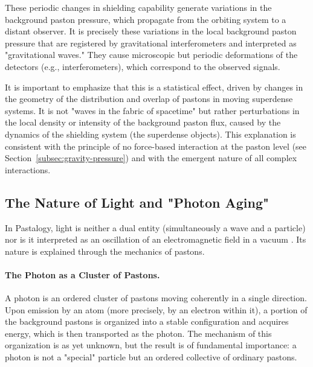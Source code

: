 \documentclass[pdflatex,sn-mathphys-num,referee]{sn-jnl}
\begin{document}
These periodic changes in shielding capability generate variations in the background paston pressure, which propagate from the orbiting system to a distant observer. It is precisely these variations in the local background paston pressure that are registered by gravitational interferometers and interpreted as "gravitational waves." They cause microscopic but periodic deformations of the detectors (e.g., interferometers), which correspond to the observed signals.

It is important to emphasize that this is a statistical effect, driven by changes in the geometry of the distribution and overlap of pastons in moving superdense systems. It is not "waves in the fabric of spacetime" but rather perturbations in the local density or intensity of the background paston flux, caused by the dynamics of the shielding system (the superdense objects). This explanation is consistent with the principle of no force-based interaction at the paston level (see Section~\ref{subsec:gravity-pressure}) and with the emergent nature of all complex interactions.

\subsection{The Nature of Light and "Photon Aging"}\label{subsec:light-aging}

In Pastalogy, light is neither a dual entity (simultaneously a wave and a particle) \cite{debroglie1924-thesis} nor is it interpreted as an oscillation of an electromagnetic field in a vacuum \cite{maxwell1873-treatise}. Its nature is explained through the mechanics of pastons.

\paragraph{The Photon as a Cluster of Pastons.}
A photon is an ordered cluster of pastons moving coherently in a single direction. Upon emission by an atom (more precisely, by an electron within it), a portion of the background pastons is organized into a stable configuration and acquires energy, which is then transported as the photon. The mechanism of this organization is as yet unknown, but the result is of fundamental importance: a photon is not a "special" particle but an ordered collective of ordinary pastons.
\end{document}
